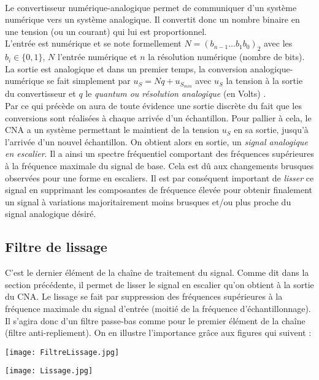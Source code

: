 \paragraph{}
Le convertisseur numérique-analogique permet de communiquer d'un système numérique vers un système
analogique. Il convertit donc un nombre binaire en une tension (ou un courant) qui lui est proportionnel.\\ L'entrée est numérique et se note formellement $ N = (b_{n-1}…b_{1}b_{0})_{2} $ avec les $ b_{i} \in \lbrace 0,1\rbrace $, $ N $ l'entrée numérique et $ n $ la résolution numérique (nombre de bits). La sortie est analogique et dans un premier temps, la conversion analogique-numérique se fait simplement par $ u_{S} = Nq + u_{S_{min}} $ avec $ u_{S} $ la tension à la sortie du convertisseur et $ q $ le \emph{ quantum ou résolution analogique} (en Volts) \cite{20Electro}.\\
Par ce qui précède on aura de toute évidence une sortie discrète du fait que les conversions sont réalisées à chaque arrivée d'un échantillon. Pour pallier à cela, le CNA a un système permettant le maintient de la tension $ u_{S} $ en sa sortie, jusqu'à l'arrivée d'un nouvel échantillon. On obtient alors en sortie, un \emph{signal analogique en escalier}. Il a ainsi un spectre fréquentiel comportant des fréquences supérieures à la fréquence maximale du signal de base. Cela est dû aux changements brusques observées pour une forme en escaliers. Il est par conséquent important de \emph{lisser} ce signal en supprimant les composantes de fréquence élevée pour obtenir finalement un signal à variations majoritairement moins brusques et/ou plus proche du signal analogique désiré.
\subsection{Filtre de lissage}
C'est le dernier élément de la chaîne de traitement du signal. Comme dit dans la section précédente, il permet de lisser le signal en escalier qu'on obtient à la sortie du CNA. Le lissage se fait par suppression des fréquences supérieures à la fréquence maximale du signal d'entrée (moitié de la fréquence d'échantillonnage). Il s'agira donc d'un filtre passe-bas comme pour le premier élément de la chaîne (filtre anti-repliement). On en illustre l'importance grâce aux figures qui suivent \cite{CoursConv} :
\begin{center}
\texttt{[image: FiltreLissage.jpg]}
\end{center}
\begin{center}
\texttt{[image: Lissage.jpg]}
\end{center}\newpage

